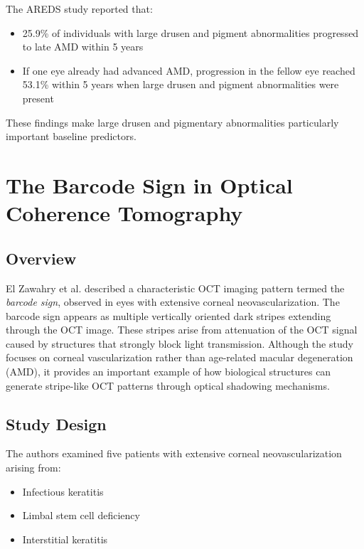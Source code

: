 \documentclass[11pt]{article}
\begin{document}
The AREDS study reported that:

\begin{itemize}
    \item 25.9\% of individuals with large drusen and pigment abnormalities progressed to late AMD within 5 years
    \item If one eye already had advanced AMD, progression in the fellow eye reached 53.1\% within 5 years when large drusen and pigment abnormalities were present
\end{itemize}

These findings make large drusen and pigmentary abnormalities particularly important baseline predictors.  

\section{The Barcode Sign in Optical Coherence Tomography}

\subsection*{Overview}

El Zawahry et al. described a characteristic OCT imaging pattern termed the \emph{barcode sign}, observed in eyes with extensive corneal neovascularization.
The barcode sign appears as multiple vertically oriented dark stripes extending through the OCT image. These stripes arise from attenuation of the OCT signal caused by structures that strongly block light transmission.
Although the study focuses on corneal vascularization rather than age-related macular degeneration (AMD), it provides an important example of how biological structures can generate stripe-like OCT patterns through optical shadowing mechanisms.

\subsection*{Study Design}

The authors examined five patients with extensive corneal neovascularization arising from:

\begin{itemize}
    \item Infectious keratitis
    \item Limbal stem cell deficiency
    \item Interstitial keratitis
\end{itemize}
\end{document}
